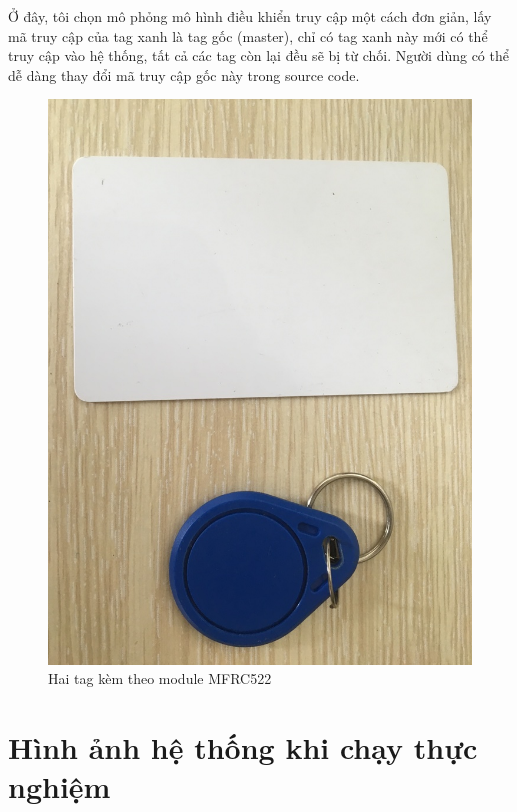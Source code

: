 Ở đây, tôi chọn mô phỏng mô hình điều khiển truy cập một cách đơn giản, lấy mã truy cập của tag xanh là tag gốc (master),
chỉ có tag xanh này mới có thể truy cập vào hệ thống, tất cả các tag còn lại đều sẽ bị từ chối.
Người dùng có thể dễ dàng thay đổi mã truy cập gốc này trong source code.
\begin{figure}[ht]
\centering
\includegraphics[scale=0.3]{images/default_tags.jpg}
\caption{Hai tag kèm theo module MFRC522}
\label{fig:default_tags}
\end{figure}

\section{Hình ảnh hệ thống khi chạy thực nghiệm}
